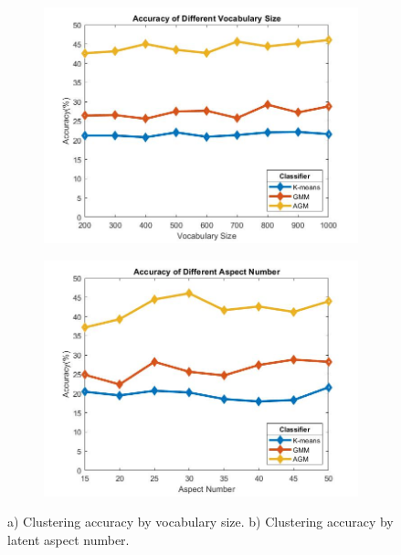 \documentclass[conference]{IEEEtran}
\begin{document}
\begin{figure}[b]
    \centering
    \begin{subfigure}[b]{0.22\paperwidth}
        \centering
        \includegraphics[width=0.20\paperwidth]{accurVoc.jpg}
        \caption{}
    \end{subfigure}
    \begin{subfigure}[b]{0.22\textwidth}
        \centering
        \includegraphics[width=0.20\paperwidth]{accurAspect.jpg}
        \caption{}
    \end{subfigure}
    \caption{a) Clustering accuracy by vocabulary size.  b) Clustering accuracy by latent aspect number.}\label{fig:3}
\end{figure}
\end{document}
